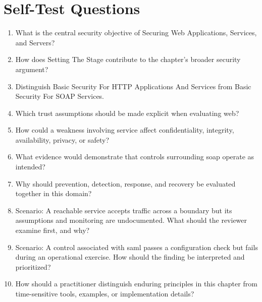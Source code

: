 \documentclass[11pt]{article}
\begin{document}
\section*{Self-Test Questions}
\begin{enumerate}
\item What is the central security objective of Securing Web Applications, Services, and Servers?
\item How does Setting The Stage contribute to the chapter's broader security argument?
\item Distinguish Basic Security For HTTP Applications And Services from Basic Security For SOAP Services.
\item Which trust assumptions should be made explicit when evaluating web?
\item How could a weakness involving service affect confidentiality, integrity, availability, privacy, or safety?
\item What evidence would demonstrate that controls surrounding soap operate as intended?
\item Why should prevention, detection, response, and recovery be evaluated together in this domain?
\item Scenario: A reachable service accepts traffic across a boundary but its assumptions and monitoring are undocumented. What should the reviewer examine first, and why?
\item Scenario: A control associated with saml passes a configuration check but fails during an operational exercise. How should the finding be interpreted and prioritized?
\item How should a practitioner distinguish enduring principles in this chapter from time-sensitive tools, examples, or implementation details?
\end{enumerate}
\end{document}
